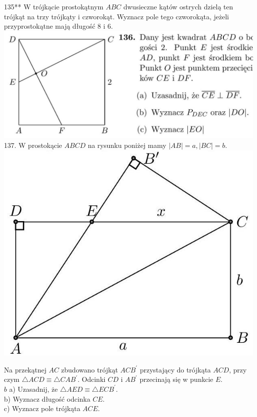 \documentclass[10pt]{article}
\begin{document}
135** W trójkącie prostokątnym \(A B C\) dwusieczne kątów ostrych dzielą ten trójkąt na trzy trójkąty i czworokąt. Wyznacz pole tego czworokąta, jeżeli przyprostokątne mają długość 8 i 6.\\
\includegraphics[max width=\textwidth, center]{2024_11_21_71f62bd117d375398909g-146(1)}\\
137. W prostokącie \(A B C D\) na rysunku poniżej mamy \(|A B|=a,|B C|=b\).\\
\includegraphics[max width=\textwidth, center]{2024_11_21_71f62bd117d375398909g-146}

Na przekątnej \(A C\) zbudowano trójkąt \(A C B^{\prime}\) przystający do trójkąta \(A C D\), przy czym \(\triangle A C D \equiv \triangle C A B^{\prime}\). Odcinki \(C D\) i \(A B^{\prime}\) przecinają się w punkcie \(E\).\\
\(b\) a) Uzasadnij, że \(\triangle A E D \equiv \triangle E C B^{\prime}\).\\
b) Wyznacz długość odcinka \(C E\).\\
c) Wyznacz pole trójkąta \(A C E\).
\end{document}
